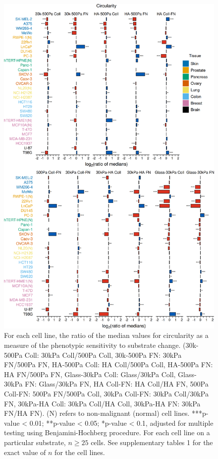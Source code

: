 \documentclass[11pt,letterpaper,english,oneside]{article} %
\begin{document}
\begin{figure}[H]
    \vspace*{-0.65cm}
    \centering
    \includegraphics{../Figures/Supplementary_Figure5/supplementary_figure5.png}
    \caption{For each cell line, the ratio of the median values for circularity as a measure of the phenotypic sensitivity to substrate change. 
    (30k-500Pa Coll: 30kPa Coll/500Pa Coll, 30k-500Pa FN: 30kPa FN/500Pa FN, HA-500Pa Coll: HA Coll/500Pa Coll, HA-500Pa  FN: HA FN/500Pa FN, Glass-30kPa Coll: Glass/30kPa Coll, Glass-30kPa FN: Glass/30kPa FN, 
    HA Coll-FN: HA Coll/HA FN, 500Pa Coll-FN: 500Pa FN/500Pa Coll, 30kPa Coll-FN: 30kPa Coll/30kPa FN, 30kPa-HA Coll: 30kPa Coll/HA Coll, 30kPa-HA FN: 30kPa FN/HA FN). (N) refers to non-malignant (normal) cell lines.
    ***p-value < 0.01; **p-value < 0.05; *p-value < 0.1, adjusted for multiple testing using Benjamini-Hochberg procedure. 
    For each cell line on a particular substrate, $n \geq 25$ cells.
    See supplementary tables 1 for the exact value of $n$ for the cell lines.}
    \label{fig:fig5}
\end{figure}
\end{document}
